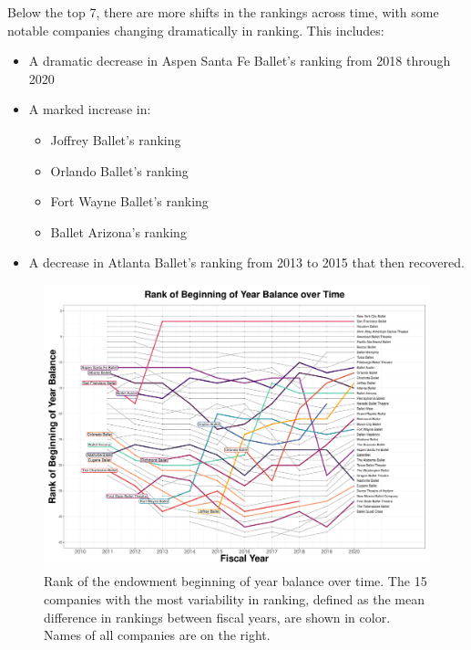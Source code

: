 \documentclass[Dance Data
Project,article,submit,moreauthors,pdftex]{mdpi}
\providecommand{\tightlist}{%
  \setlength{\itemsep}{0pt}\setlength{\parskip}{0pt}}
\begin{document}
Below the top 7, there are more shifts in the rankings across time, with
some notable companies changing dramatically in ranking. This includes:

\begin{itemize}
\tightlist
\item
  A dramatic decrease in Aspen Santa Fe Ballet's ranking from 2018
  through 2020
\item
  A marked increase in:

  \begin{itemize}
  \tightlist
  \item
    Joffrey Ballet's ranking
  \item
    Orlando Ballet's ranking
  \item
    Fort Wayne Ballet's ranking
  \item
    Ballet Arizona's ranking
  \end{itemize}
\item
  A decrease in Atlanta Ballet's ranking from 2013 to 2015 that then
  recovered.
\end{itemize}

\begin{figure}[H]
\includegraphics[width=1\linewidth,]{../images/rank_of_beginning_year_balance} \caption{\label{fig:rank-endowments}Rank of the endowment beginning of year balance over time. The 15 companies with the most variability in ranking, defined as the mean difference in rankings between fiscal years, are shown in color. Names of all companies are on the right.}\label{fig:rank-og-beginning-year-balance}
\end{figure}
\end{document}
